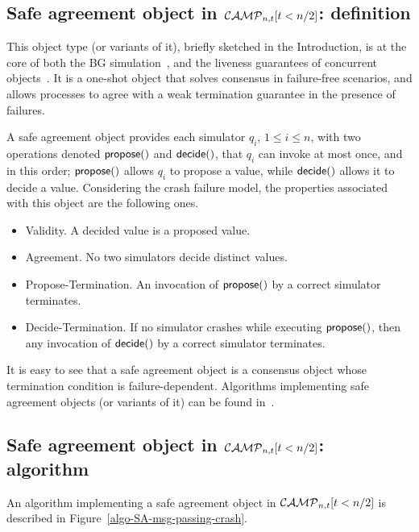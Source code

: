 \documentclass[11pt,letterpaper]{article}
\newcommand{\CM}{{\cal CAMP}_{n,t}}
\begin{document}
\subsection{Safe agreement object in $\CM[t<n/2]$: definition}
This object type (or variants of it), briefly sketched in the Introduction,
is at the core of both the BG simulation~\cite{BG93,BGLR01, G09,IR09}, and
the liveness guarantees of concurrent objects~\cite{IR11,IR11-a}.
It is a one-shot object that solves consensus in failure-free scenarios,
and allows processes to agree with  a weak termination guarantee
in the presence of failures.

A safe agreement object provides each simulator $q_i$,
$1\leq i\leq n$,  with two operations
denoted ${\sf propose}()$ and  ${\sf decide}()$, that $q_i$ can invoke
at most once, and in this order;  ${\sf propose}()$ allows $q_i$ to propose
a value, while  ${\sf decide}()$ allows it to decide a value.
Considering the crash failure model, the properties associated with this
object are the following ones.
\begin{itemize}
\vspace{-0.2cm}
\item Validity. A decided value is a proposed value.
\vspace{-0.2cm}
\item Agreement. No two simulators decide distinct values.
\vspace{-0.2cm}
\item Propose-Termination.
An invocation of  ${\sf propose}()$ by a correct simulator terminates.
\vspace{-0.2cm}
\item Decide-Termination.
If no simulator crashes while executing  ${\sf propose}()$, then any
invocation of ${\sf decide}()$ by a correct simulator terminates.
\end{itemize}
It is easy to see that a safe agreement object is a consensus object whose
termination condition is failure-dependent. Algorithms implementing 
safe agreement
objects (or variants of it) can be found in~\cite{BG93,BGLR01,IR11-a}.


\subsection{Safe agreement object in $\CM[t<n/2]$: algorithm}
An algorithm implementing a safe agreement object in $\CM[t<n/2]$ is described
in Figure~\ref{algo-SA-msg-passing-crash}.
\end{document}

